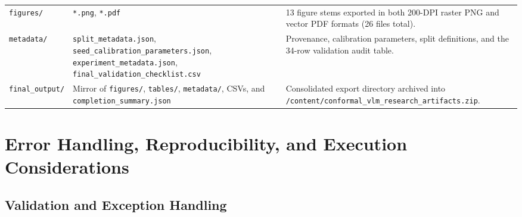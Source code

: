 \documentclass[11pt,a4paper]{article}
\begin{document}
\begin{table}[!htbp]
\begin{tabularx}{\textwidth}{L{0.16\textwidth} L{0.28\textwidth} Y}
\texttt{figures/\allowbreak{}} & \texttt{*.\allowbreak{}png}, \texttt{*.\allowbreak{}pdf} & 13 figure stems exported in both 200-DPI raster PNG and vector PDF formats (26 files total). \\
\texttt{metadata/\allowbreak{}} & \texttt{split\_\allowbreak{}metadata.\allowbreak{}json}, \texttt{seed\_\allowbreak{}calibration\_\allowbreak{}parameters.\allowbreak{}json}, \texttt{experiment\_\allowbreak{}metadata.\allowbreak{}json}, \texttt{final\_\allowbreak{}validation\_\allowbreak{}checklist.\allowbreak{}csv} & Provenance, calibration parameters, split definitions, and the 34-row validation audit table. \\
\texttt{final\_\allowbreak{}output/\allowbreak{}} & Mirror of \texttt{figures/\allowbreak{}}, \texttt{tables/\allowbreak{}}, \texttt{metadata/\allowbreak{}}, CSVs, and \texttt{completion\_\allowbreak{}summary.\allowbreak{}json} & Consolidated export directory archived into \texttt{/\allowbreak{}content/\allowbreak{}conformal\_\allowbreak{}vlm\_\allowbreak{}research\_\allowbreak{}artifacts.\allowbreak{}zip}. \\
\bottomrule
\end{tabularx}
\end{table}

\section{Error Handling, Reproducibility, and Execution Considerations}

\subsection{Validation and Exception Handling}
\end{document}
